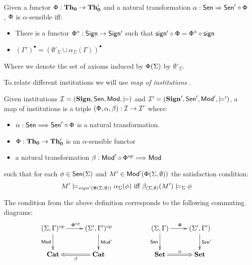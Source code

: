 \documentclass[10pt]{article}
\begin{document}
\begin{definition}
Given a functor ${\sf {\Phi}}:{\bf Th_0} \to {\bf Th_0'}$ and a natural
transformation $\alpha: {\sf {Sen}} \Rightarrow {\sf {Sen}}' \circ {\sf {\Phi}}$, ${\sf {\Phi}}$ is
$\alpha$-sensible iff:
\begin{itemize}
	\item There is a functor ${\sf {\Phi^{\diamond}}}:{\sf {Sign}} \to {\sf {Sign'}}$ such that ${\sf {sign'}} \circ {\sf {\Phi}} ={\sf {\Phi^\diamond}}  \circ  {\sf {sign}}$
	\item $(\Gamma')^\bullet = (\emptyset'_{\Sigma} \cup \alpha_{\Sigma}(\Gamma))^{\bullet}$
\end{itemize}
Where we denote the set of axioms induced by ${\sf {\Phi}}(\Sigma)$ by $\emptyset'_{\Sigma}$.
\end{definition}
%
To relate different institutions we will use {\it map of institutions} \cite{general}.
\begin{definition}		
Given institutions ${\mathcal{I}}= ({{\bf Sign}},{\sf {Sen}},{\sf {Mod}},\models)$ and
${\mathcal{I'}}=({{\bf Sign}'},{\sf {Sen}}',{\sf {Mod}}',\models')$, 
a map of institutions is a triple  $({\sf {\Phi}},\alpha,\beta): {\mathcal{I}} \to {\mathcal{I'}}$ where:
\begin{itemize}
	\item $\alpha: {\sf {Sen}} \mathrel{\Longrightarrow} {\sf {Sen}}' \circ {\sf {\Phi}}$ is a natural transformation.
	\item ${\sf {\Phi}}: {\bf Th_0} \to {\bf Th_0'}$ is an $\alpha$-sensible functor %
\item a natural transformation $\beta: {\sf {Mod}}' \circ {\sf {\Phi}}^{op} \mathrel{\Longrightarrow} {\sf {Mod}}$
\end{itemize}
such that for each $\phi \in {\sf {Sen}}(\Sigma)$ and $ M' \in {\sf {Mod}}'({\sf {\Phi}}(\Sigma,\emptyset))$ the satisfaction condition:
\[ M' \models_{sign'({\sf {\Phi}}(\Sigma,\emptyset))} \alpha_{\Sigma}(\phi) \mbox{ iff } \beta_{(\Sigma,\emptyset)} (M') \models_{\Sigma} \phi \]
\end{definition}
%
The condition from the above definition corresponds to the following
commuting diagrams:
\[
\xymatrix{
	(\Sigma,\Gamma)^{op} \ar[d]_{\Mod} \ar[r]^{\fu{\Phi}^{op}}
		& (\Sigma',\Gamma')^{op} \ar[d]^{{\Mod'}}	\\
	\cat{Cat}
		& \mathbf{Cat}	\ar@{=>}[l]^{\beta}\\
}\hspace*{5em}
\xymatrix{
	(\Sigma,\Gamma) \ar[d]_{\sen} \ar[r]^{\fu{\Phi}}
		& (\Sigma',\Gamma') \ar[d]^{\sen'}	\\
	\cat{Set} \ar@{=>}[r]^{\alpha}
		& \cat{Set}				\\
}
\]
\end{document}
